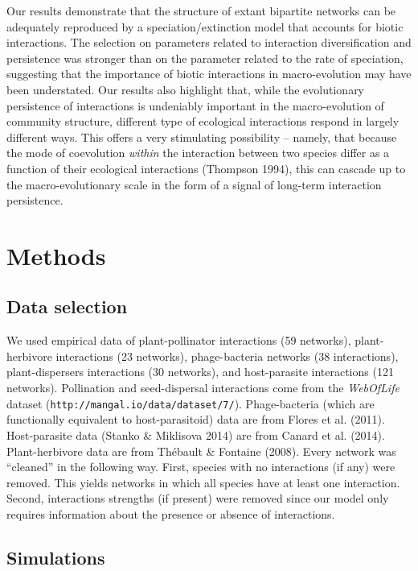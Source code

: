 \documentclass[12pt]{article}
\begin{document}
Our results demonstrate that the structure of extant bipartite networks
can be adequately reproduced by a speciation/extinction model that
accounts for biotic interactions. The selection on parameters related to
interaction diversification and persistence was stronger than on the
parameter related to the rate of speciation, suggesting that the
importance of biotic interactions in macro-evolution may have been
understated. Our results also highlight that, while the evolutionary
persistence of interactions is undeniably important in the
macro-evolution of community structure, different type of ecological
interactions respond in largely different ways. This offers a very
stimulating possibility -- namely, that because the mode of coevolution
\emph{within} the interaction between two species differ as a function
of their ecological interactions (Thompson 1994), this can cascade up to
the macro-evolutionary scale in the form of a signal of long-term
interaction persistence.

\section{Methods}\label{methods}

\subsection{Data selection}\label{data-selection}

We used empirical data of plant-pollinator interactions (59 networks),
plant-herbivore interactions (23 networks), phage-bacteria networks (38
interactions), plant-dispersers interactions (30 networks), and
host-parasite interactions (121 networks). Pollination and
seed-dispersal interactions come from the \emph{WebOfLife} dataset
(\texttt{http://mangal.io/data/dataset/7/}). Phage-bacteria (which are
functionally equivalent to host-parasitoid) data are from Flores et al.
(2011). Host-parasite data (Stanko \& Miklisova 2014) are from Canard et
al. (2014). Plant-herbivore data are from Thébault \& Fontaine (2008).
Every network was ``cleaned'' in the following way. First, species with
no interactions (if any) were removed. This yields networks in which all
species have at least one interaction. Second, interactions strengths
(if present) were removed since our model only requires information
about the presence or absence of interactions.

\subsection{Simulations}\label{simulations}
\end{document}
